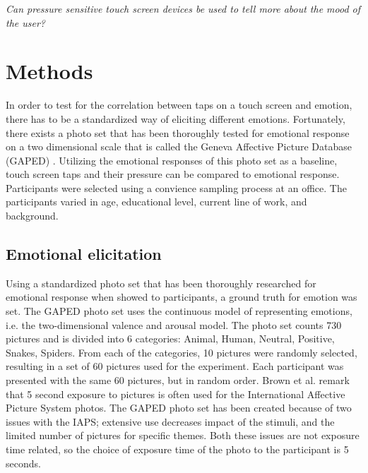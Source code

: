 \documentclass{sigchi}
\begin{document}
\textit{Can pressure sensitive touch screen devices be used to tell more about the mood of the user?}\\


\section{Methods} %
\label{sec:methods}
In order to test for the correlation between taps on a touch screen and emotion, there has to be a standardized way of eliciting different emotions. Fortunately, there exists a photo set that has been thoroughly tested for emotional response on a two dimensional scale that is called the Geneva Affective Picture Database (GAPED) \cite{Dan-glauser2011}. Utilizing the emotional responses of this photo set as a baseline, touch screen taps and their pressure can be compared to emotional response.
Participants were selected using a convience sampling process at an office. The participants varied in age, educational level, current line of work, and background.

\subsection{Emotional elicitation} %
\label{sub:emotional_elicitation}
Using a standardized photo set that has been thoroughly researched for emotional response when showed to participants, a ground truth for emotion was set. The GAPED photo set uses the continuous model of representing emotions, i.e. the two-dimensional valence and arousal model. The photo set counts 730 pictures and is divided into 6 categories: Animal, Human, Neutral, Positive, Snakes, Spiders. From each of the categories, 10 pictures were randomly selected, resulting in a set of 60 pictures used for the experiment. Each participant was presented with the same 60 pictures, but in random order.
Brown et al. \cite{Neuroscience2012} remark that 5 second exposure to pictures is often used for the International Affective Picture System photos. The GAPED photo set has been created because of two issues with the IAPS; extensive use decreases impact of the stimuli, and the limited number of pictures for specific themes. Both these issues are not exposure time related, so the choice of exposure time of the photo to the participant is 5 seconds.
\end{document}
